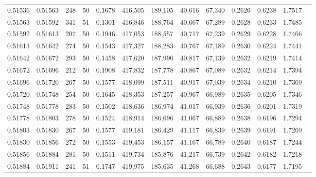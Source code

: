 \begin{tabular}{rrrrrrrrrrrrr}
0.51536 & 0.51563 &   248 &  50 &                                     0.1678 & 416,505 & 189,105 &  40,616 &  67,340 & 0.2626 & 0.6238 & 1.7517 \\
0.51563 & 0.51592 &   341 &  51 &                                     0.1301 & 416,846 & 188,764 &  40,667 &  67,289 & 0.2628 & 0.6233 & 1.7485 \\
0.51592 & 0.51613 &   207 &  50 &                                     0.1946 & 417,053 & 188,557 &  40,717 &  67,239 & 0.2629 & 0.6228 & 1.7466 \\
0.51613 & 0.51642 &   274 &  50 &                                     0.1543 & 417,327 & 188,283 &  40,767 &  67,189 & 0.2630 & 0.6224 & 1.7441 \\
0.51642 & 0.51672 &   293 &  50 &                                     0.1458 & 417,620 & 187,990 &  40,817 &  67,139 & 0.2632 & 0.6219 & 1.7414 \\
0.51672 & 0.51696 &   212 &  50 &                                     0.1908 & 417,832 & 187,778 &  40,867 &  67,089 & 0.2632 & 0.6214 & 1.7394 \\
0.51696 & 0.51720 &   267 &  50 &                                     0.1577 & 418,099 & 187,511 &  40,917 &  67,039 & 0.2634 & 0.6210 & 1.7369 \\
0.51720 & 0.51748 &   254 &  50 &                                     0.1645 & 418,353 & 187,257 &  40,967 &  66,989 & 0.2635 & 0.6205 & 1.7346 \\
0.51748 & 0.51778 &   283 &  50 &                                     0.1502 & 418,636 & 186,974 &  41,017 &  66,939 & 0.2636 & 0.6201 & 1.7319 \\
0.51778 & 0.51803 &   278 &  50 &                                     0.1524 & 418,914 & 186,696 &  41,067 &  66,889 & 0.2638 & 0.6196 & 1.7294 \\
0.51803 & 0.51830 &   267 &  50 &                                     0.1577 & 419,181 & 186,429 &  41,117 &  66,839 & 0.2639 & 0.6191 & 1.7269 \\
0.51830 & 0.51856 &   272 &  50 &                                     0.1553 & 419,453 & 186,157 &  41,167 &  66,789 & 0.2640 & 0.6187 & 1.7244 \\
0.51856 & 0.51884 &   281 &  50 &                                     0.1511 & 419,734 & 185,876 &  41,217 &  66,739 & 0.2642 & 0.6182 & 1.7218 \\
0.51884 & 0.51911 &   241 &  51 &                                     0.1747 & 419,975 & 185,635 &  41,268 &  66,688 & 0.2643 & 0.6177 & 1.7195 \\

\end{tabular}
